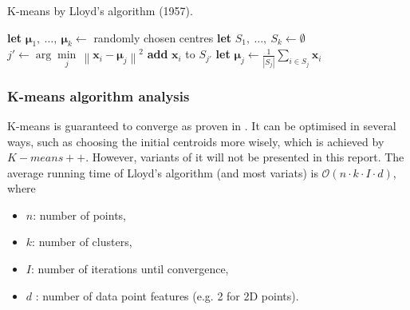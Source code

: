 \documentclass[a4paper]{article}
\begin{document}
\begin{algorithm}[H] %
\caption{K-means by Lloyd's algorithm (1957).}
\label{alg:k_means_lloyd}
\begin{algorithmic}[1]
\State \textbf{let} $\boldsymbol{\mu}_1,\ \ldots,\ \boldsymbol{\mu}_k \leftarrow$ randomly chosen centres
\State \textbf{let} $S_1, \ \ldots, \ S_k \leftarrow \emptyset$
  
        \State $j' \leftarrow \arg \underset{j}{\mathop{\min }}\,\left\| {{\mathbf{x}}_{i}}-{{\boldsymbol{\mu} }_{j}} \right\| ^ 2$
        \State \textbf{add} $\textbf{x}_i$ to $S_{j'}$
    \EndFor
    \EndFor
     
        \State \textbf{let} $\boldsymbol{\mu}_j \leftarrow \frac{1}{\left| S_j \right|} \sum \limits_{i \in S_j}{\textbf{x}_i}$ 
    \EndFor

\EndWhile
\EndProcedure
\end{algorithmic}
\end{algorithm}


\subsubsection{K-means algorithm analysis}

K-means is guaranteed to converge as proven in \TODO[ref]. It can be optimised in several ways, such as choosing the initial centroids more wisely, which is achieved by $K-means++$. However, variants of it will not be presented in this report. The average running time of Lloyd's algorithm (and most variats) is $\mathcal{O}(n\cdot k \cdot I \cdot d)$, where
\begin{itemize}
    \item $n$: number of points,
    \item $k$: number of clusters,
    \item $I$: number of iterations until convergence,
    \item $d$ : number of data point features (e.g. 2 for 2D points).
\end{itemize}
\end{document}
